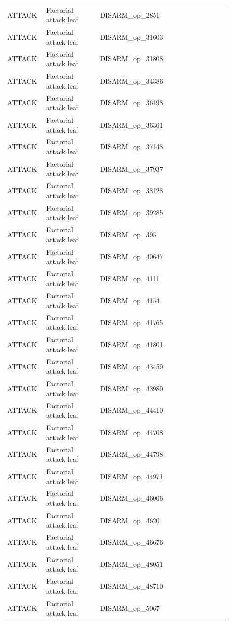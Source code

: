 \begin{table}[htbp]
\begin{threeparttable}
\begin{tabular}{p{0.14\linewidth}p{0.22\linewidth}p{0.54\linewidth}}
ATTACK & Factorial attack leaf & DISARM\_op\_2851 \\
ATTACK & Factorial attack leaf & DISARM\_op\_31603 \\
ATTACK & Factorial attack leaf & DISARM\_op\_31808 \\
ATTACK & Factorial attack leaf & DISARM\_op\_34386 \\
ATTACK & Factorial attack leaf & DISARM\_op\_36198 \\
ATTACK & Factorial attack leaf & DISARM\_op\_36361 \\
ATTACK & Factorial attack leaf & DISARM\_op\_37148 \\
ATTACK & Factorial attack leaf & DISARM\_op\_37937 \\
ATTACK & Factorial attack leaf & DISARM\_op\_38128 \\
ATTACK & Factorial attack leaf & DISARM\_op\_39285 \\
ATTACK & Factorial attack leaf & DISARM\_op\_395 \\
ATTACK & Factorial attack leaf & DISARM\_op\_40647 \\
ATTACK & Factorial attack leaf & DISARM\_op\_4111 \\
ATTACK & Factorial attack leaf & DISARM\_op\_4154 \\
ATTACK & Factorial attack leaf & DISARM\_op\_41765 \\
ATTACK & Factorial attack leaf & DISARM\_op\_41801 \\
ATTACK & Factorial attack leaf & DISARM\_op\_43459 \\
ATTACK & Factorial attack leaf & DISARM\_op\_43980 \\
ATTACK & Factorial attack leaf & DISARM\_op\_44410 \\
ATTACK & Factorial attack leaf & DISARM\_op\_44708 \\
ATTACK & Factorial attack leaf & DISARM\_op\_44798 \\
ATTACK & Factorial attack leaf & DISARM\_op\_44971 \\
ATTACK & Factorial attack leaf & DISARM\_op\_46006 \\
ATTACK & Factorial attack leaf & DISARM\_op\_4620 \\
ATTACK & Factorial attack leaf & DISARM\_op\_46676 \\
ATTACK & Factorial attack leaf & DISARM\_op\_48051 \\
ATTACK & Factorial attack leaf & DISARM\_op\_48710 \\
ATTACK & Factorial attack leaf & DISARM\_op\_5067 \\

\end{tabular}
\end{threeparttable}
\end{table}
